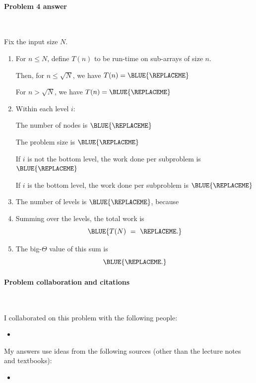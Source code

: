 \paragraph{Problem 4 answer}~

Fix the input size $N$.

\begin{enumerate}[label=(\roman*)]
\item[(i)] For $n\le N$, define $T(n)$ to be run-time on sub-arrays of size $n$.

  Then, for $n\le \sqrt N$, we have $T(n) = \BLUE{
    \REPLACEME 
  }$ 

  For $n>\sqrt N$, we have $T(n) = \BLUE{
    \REPLACEME 
  }$
  
\item[(ii)] Within each level $i$:

  The number of nodes is $\BLUE{
    \REPLACEME 
  }$
  
  The problem size is $\BLUE{
    \REPLACEME 
  }$
  
  If $i$ is not the bottom level, the work done per subproblem is $\BLUE{
    \REPLACEME 
  }$

  If $i$ is the bottom level, the work done per subproblem is $\BLUE{
    \REPLACEME 
  }$
  
\item[(iii)] The number of levels is $\BLUE{
    \REPLACEME
  }$, because 
  
\item[(iv)] Summing over the levels, the total work is
  \[\BLUE{ T(N) ~=~  
      \REPLACEME
    .}\]

\item[(v)] The big-$\Theta$ value of this sum is
  \[\BLUE{
      \REPLACEME
    .}\]

\end{enumerate}


\vfill

\paragraph{Problem  collaboration and citations}~

I collaborated on this problem with the following people:
\begin{blue}
  \begin{itemize}
  \item \REPLACEME                    %
  \end{itemize}
\end{blue}

My answers use ideas from the following sources (other than the lecture notes and textbooks): 
\begin{blue}
  \begin{itemize}
  \item \REPLACEME                    %
  \end{itemize}
\end{blue}
 
